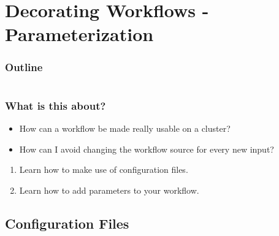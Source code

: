 \section{Decorating Workflows - Parameterization}

\begin{frame}
    \frametitle{Outline}
    \begin{columns}[t]
        \begin{column}{.5\textwidth}
            \tableofcontents[sections={1-9},currentsection]
        \end{column}
        \begin{column}{.5\textwidth}
            \tableofcontents[sections={10-18},currentsection]
        \end{column}
    \end{columns}
\end{frame}

\begin{frame}
  \frametitle{What is this about?}
   \begin{question}[Questions]
   	  \begin{itemize}
         \item How can a workflow be made really usable on a cluster?
         \item How can I avoid changing the workflow source for every new input?
      \end{itemize}
   \end{question}
   \begin{docs}[Objectives]
   	 \begin{enumerate}
                      \item Learn how to make use of configuration files.  
                      \item Learn how to add parameters to your workflow.
     \end{enumerate}
   \end{docs}
\end{frame}

\subsection{Configuration Files}


